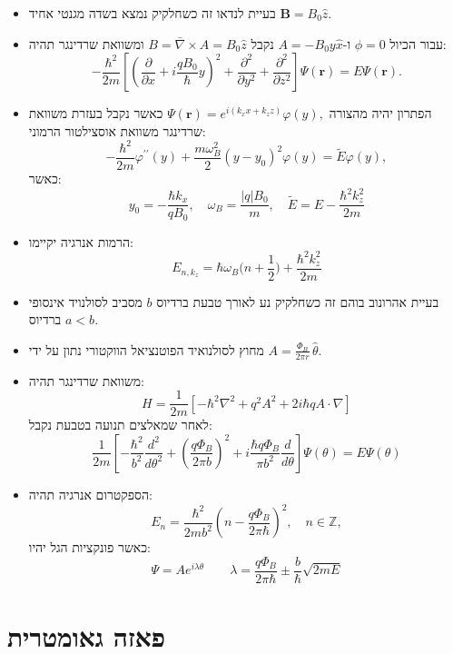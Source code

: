 \documentclass{tstextbook}
\begin{document}
\begin{summary}
  \begin{itemize}
    \item בעיית לנדאו זה כשחלקיק נמצא בשדה מגנטי אחיד \(\mathbf{B}=B_{0}\hat{z}\).
    \item עבור הכיול \(\phi=0\) ו-\(A=-B_{0}y\hat{x}\) נקבל \(B=\bar{\nabla} \times A=B_{0}\hat{z}\) ומשוואת שרדינגר תהיה:
$$-\frac{\hbar^{2}}{2m}\left[\left(\frac{\partial}{\partial x}+i\frac{q B_{0}}{\hbar}y\right)^{2}+\frac{\partial^{2}}{\partial y^{2}}+\frac{\partial^{2}}{\partial z^{2}}\right]\Psi(\mathbf{r})=E\Psi(\mathbf{r}).$$
    \item הפתרון יהיה מהצורה \(\Psi(\mathbf{r})=e^{i(k_{x}x+k_{z}z)}\varphi(y),\) כאשר נקבל בעזרת משוואת שרדינגר משוואת אוסצילטור הרמוני:
$$-\frac{\hbar^{2}}{2m}\varphi^{\prime\prime}(y)+\frac{m\omega_{B}^{2}}{2}(y-y_{0})^{2}\varphi(y)=\tilde{E}\varphi(y),$$
כאשר:
$$y_{0}=-\frac{\hbar k_{x}}{q B_{0}},\quad\omega_{B}=\frac{|q|B_{0}}{m},\quad\tilde{E}=E-\frac{\hbar^{2}k_{z}^{2}}{2m}$$
    \item הרמות אנרגיה יקיימו:
$$E_{n,k_{z}}=\hbar\omega_{B}\Big(n+\frac{1}{2}\Big)+\frac{\hbar^{2}k_{z}^{2}}{2m}$$
    \item בעיית אהרונוב בוהם זה כשחלקיק נע לאורך טבעת ברדיוס \(b\) מסביב לסולנויד אינסופי ברדיוס \(a<b\).
    \item מחוץ לסולנואיד הפוטנציאל הווקטורי נתון על ידי \(A=\frac{\Phi_{B}}{2\pi r}\,\hat{\theta}\).
    \item משוואת שרדינגר תהיה:
$$H=\frac{1}{2m}\left[-\hbar^{2}\nabla^{2}+q^{2}A^{2}+2i\hbar q A\cdot\nabla\right]$$
לאחר שמאלצים תנועה בטבעת נקבל:
$$\frac{1}{2m}\left[-\frac{\hbar^{2}}{b^{2}}\frac{d^{2}}{d\theta^{2}}+\left(\frac{q\Phi_{B}}{2\pi b}\right)^{2}+i\frac{\hbar q\Phi_{B}}{\pi b^{2}}\frac{d}{d\theta}\right]\Psi(\theta)=E\Psi(\theta)$$
    \item הספקטרום אנרגיה תהיה:
$$E_{n}=\frac{\hbar^{2}}{2m b^{2}}\left(n-\frac{q\Phi_{B}}{2\pi\hbar}\right)^{2},\quad n\in\mathbb{Z},$$
כאשר פונקציות הגל יהיו:
$$\Psi=A e^{i\lambda\theta}\qquad \lambda=\frac{q\Phi_{B}}{2\pi\hbar}\pm\frac{b}{\hbar}\sqrt{2m E}$$
  \end{itemize}
\end{summary}
\section{פאזה גאומטרית}
\end{document}
